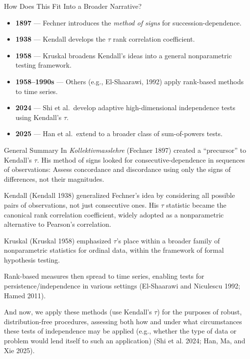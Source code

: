 \documentclass[
  ignorenonframetext,
]{beamer}
\providecommand{\tightlist}{%
  \setlength{\itemsep}{0pt}\setlength{\parskip}{0pt}}
\begin{document}
\begin{frame}{How Does This Fit Into a Broader Narrative?}
\label{how-does-this-fit-into-a-broader-narrative}
\begin{itemize}
\tightlist
\item
  \textbf{1897} --- Fechner introduces the \emph{method of signs} for
  succession-dependence.
\item
  \textbf{1938} --- Kendall develops the \(\tau\) rank correlation
  coefficient.
\item
  \textbf{1958} --- Kruskal broadens Kendall's ideas into a general
  nonparametric testing framework.
\item
  \textbf{1958--1990s} --- Others (e.g., El-Shaarawi, 1992) apply
  rank-based methods to time series.
\item
  \textbf{2024} --- Shi et al.~develop adaptive high-dimensional
  independence tests using Kendall's \(\tau\).
\item
  \textbf{2025} --- Han et al.~extend to a broader class of
  sum-of-powers tests.
\end{itemize}
\end{frame}

\begin{frame}[allowframebreaks]{General Summary}
\label{general-summary}
In \emph{Kollektivmasslehre} (Fechner 1897) created a ``precursor'' to
Kendall's \(\tau\). His method of signs looked for
consecutive-dependence in sequences of observations: Assess concordance
and discordance using only the signs of differences, not their
magnitudes.

Kendall (Kendall 1938) generalized Fechner's idea by considering all
possible pairs of observations, not just consecutive ones. His \(\tau\)
statistic became the canonical rank correlation coefficient, widely
adopted as a nonparametric alternative to Pearson's correlation.

Kruskal (Kruskal 1958) emphasized \(\tau\)'s place within a broader
family of nonparametric statistics for ordinal data, within the
framework of formal hypothesis testing.

Rank-based measures then spread to time series, enabling tests for
persistence/independence in various settings (El-Shaarawi and Niculescu
1992; Hamed 2011).

And now, we apply these methods (use Kendall's \(\tau\)) for the
purposes of robust, distribution-free procedures, assessing both how and
under what circumstances these tests of independence may be applied
(e.g., whether the type of data or problem would lend itself to such an
application) (Shi et al. 2024; Han, Ma, and Xie 2025).
\end{frame}
\end{document}
